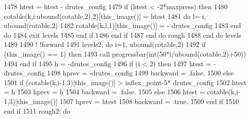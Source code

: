 \begin{DoxyCode}
1478                                       htest = htest - drutes_config%
1479                                       \textcolor{keywordflow}{if} (htest < -2*maxpress) \textcolor{keywordflow}{then}
1480                                         cotable(k,i:ubound(cotable,2),2)[this\_image()] = htest
1481                                         \textcolor{keywordflow}{do} l= i, ubound(cotable,2)
1482                                           cotable(k,l,1)[this\_image()] = -
      drutes_config%
1483 \textcolor{keywordflow}{                                        end do}
1484                                         \textcolor{keywordflow}{exit} levels
1485 \textcolor{keywordflow}{                                      end if}
1486 \textcolor{keywordflow}{                                    end if}
1487 \textcolor{keywordflow}{                            end do} rough
1488 \textcolor{keywordflow}{                  end do} levels
1489 
1490     \textcolor{comment}{!             !forward}
1491                   levels2: \textcolor{keywordflow}{do} i=1, ubound(cotable,2)
1492                             \textcolor{keywordflow}{if} (this\_image() == 1) \textcolor{keywordflow}{then}
1493                               \textcolor{keyword}{call }progressbar(int(50*i/ubound(cotable,2)+50))
1494 \textcolor{keywordflow}{                            end if}
1495                             h = -drutes_config%
1496                             \textcolor{keywordflow}{if} (i < 2) \textcolor{keywordflow}{then}
1497                               htest = -drutes_config%
1498                               hprev = -drutes_config%
1499                               backward = .false.
1500                             \textcolor{keywordflow}{else}
1501                               \textcolor{keywordflow}{if} (cotable(k,i-1,3)[this\_image()] > inflex\_point-5*
      drutes_config%
1502                                 htest = h
1503                                 hprev = h
1504                                 backward = .false.
1505                               \textcolor{keywordflow}{else}
1506                                 htest = cotable(k,i-1,3)[this\_image()]
1507                                 hprev = htest
1508                                 backward = .true.
1509 \textcolor{keywordflow}{                              end if}
1510 \textcolor{keywordflow}{                            end if}
1511                             rough2: \textcolor{keywordflow}{do}

\end{DoxyCode}
